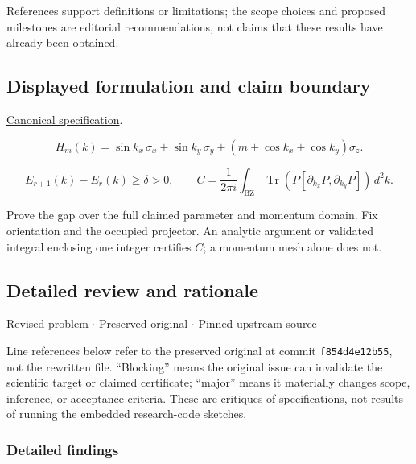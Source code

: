 \documentclass[
  11pt,
]{article}
\begin{document}
References support definitions or limitations; the scope choices and
proposed milestones are editorial recommendations, not claims that these
results have already been obtained.

\subsection{Displayed formulation and claim boundary}

\href{https://github.com/rick-stevens-ai/Pure-Thought/blob/main/PRDs/09-Topological-Band-Theory.md}{Canonical
specification}.

\[H_m(k)=\sin k_x\,\sigma_x+\sin k_y\,\sigma_y+
(m+\cos k_x+\cos k_y)\sigma_z.\]

\[E_{r+1}(k)-E_r(k)\ge\delta>0,\qquad
C=\frac{1}{2\pi i}\int_{\mathrm{BZ}}
\operatorname{Tr}\!\left(P[\partial_{k_x}P,\partial_{k_y}P]\right)\,d^2k.\]

Prove the gap over the full claimed parameter and momentum domain. Fix
orientation and the occupied projector. An analytic argument or
validated integral enclosing one integer certifies \(C\); a momentum
mesh alone does not.

\subsection{Detailed review and rationale}

\href{https://github.com/rick-stevens-ai/Pure-Thought/blob/main/PRDs/09-Topological-Band-Theory.md}{Revised
problem} \ensuremath{\cdot}
\href{https://github.com/rick-stevens-ai/Pure-Thought/blob/main/archive/original-PRDs/09-Topological-Band-Theory.md}{Preserved
original} \ensuremath{\cdot}
\href{https://github.com/rick-stevens-ai/Pure-Thought/blob/f854d4e12b55c1f5b5c2a964b75f2d23496d981e/PRDs/09-Topological-Band-Theory.md}{Pinned
upstream source}

Line references below refer to the preserved original at commit
\texttt{f854d4e12b55}, not the rewritten file. ``Blocking'' means the
original issue can invalidate the scientific target or claimed
certificate; ``major'' means it materially changes scope, inference, or
acceptance criteria. These are critiques of specifications, not results
of running the embedded research-code sketches.

\subsubsection{Detailed findings}
\end{document}
